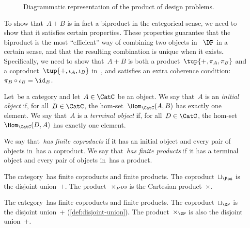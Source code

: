 \begin{figure}[h!]
  \begin{center}
  \end{center}
  \caption{Diagrammatic representation of the product of design problems. \label{fig:productdp}}
\end{figure}


To show that~$A + B$ is in fact a biproduct in the categorical sense, we need to show that it satisfies certain properties. These properties guarantee that the biproduct is the most ``efficient'' way of combining two objects in~$~\DP$ in a certain sense, and that the resulting combination is unique when it exists. Specifically, we need to show that~$A + B$ is both a product~$\tup{+, \pi_A, \pi_B}$ and a coproduct~$\tup{+, \iota_A, \iota_B}$ in~\DP, and satisfies an extra coherence condition:~$\pi_B \circ \iota_B = \id_B$.

\begin{ctdefinition}
  Let~\CatC be a category and let~$A \in \CatC$ be an object. We say that~$A$ is an \emph{initial object} if, for all~$B \in\CatC$, the hom-set~$\Hom_\CatC(A,B)$ has exactly one element. We say that~$A$ is a \emph{terminal object} if, for all~$D\in\CatC$, the hom-set~$\Hom_\CatC(D,A)$ has exactly one element.
\end{ctdefinition}

\begin{ctdefinition}
  We say that~\CatC \emph{has finite coproducts} if it has an initial object and every pair of objects in~\CatC has a coproduct.
  We say that~\CatC \emph{has finite products} if it has a terminal object and every pair of objects in~\CatC has a product.
\end{ctdefinition}

\begin{example}
  The category~\Pos has finite coproducts and finite products.
  The coproduct~$\sqcup_\Pos$ is the disjoint union~$+$.
  The product~$\times_Pos$ is the Cartesian product~$\times$.
\end{example}

\begin{lemma}
  The category~\DP has finite coproducts and finite products.
  The coproduct~$\sqcup_\DP$ is the disjoint union~$+$ (\cref{def:disjoint-union}).
  The product~$\times_\DP$ is also the disjoint union~$+$.
\end{lemma}

